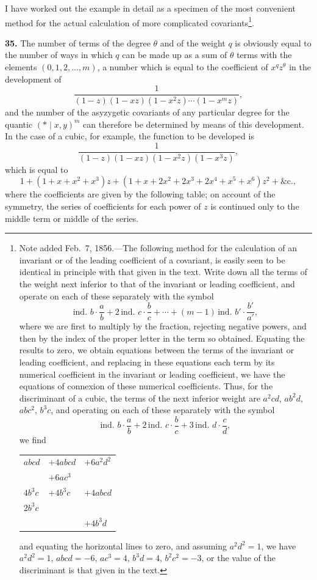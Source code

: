 \documentclass[11pt]{article}
\begin{document}
I have worked out the example in detail as a specimen of the most convenient method for the actual calculation of more complicated covariants\footnote{Note added Feb.~7, 1856.---The following method for the calculation of an invariant or of the leading coefficient of a covariant, is easily seen to be identical in principle with that given in the text. Write down all the terms of the weight next inferior to that of the invariant or leading coefficient, and operate on each of these separately with the symbol
\[
\text{ind. } b\cdot\frac{a}{b} + 2\,\text{ind. } c\cdot\frac{b}{c} + \cdots + (m-1)\,\text{ind. } b'\cdot\frac{b'}{a'},
\]
where we are first to multiply by the fraction, rejecting negative powers, and then by the index of the proper letter in the term so obtained. Equating the results to zero, we obtain equations between the terms of the invariant or leading coefficient, and replacing in these equations each term by its numerical coefficient in the invariant or leading coefficient, we have the equations of connexion of these numerical coefficients. Thus, for the discriminant of a cubic, the terms of the next inferior weight are $a^2 cd$, $ab^2 d$, $abc^2$, $b^3 c$, and operating on each of these separately with the symbol
\[
\text{ind. } b\cdot\frac{a}{b} + 2\,\text{ind. } c\cdot\frac{b}{c} + 3\,\text{ind. } d\cdot\frac{c}{d},
\]
we find
\begin{center}
\begin{tabular}{lll}
$abcd$        & $+ 4 abcd$ & $+ 6 a^2 d^2$ \\
              & $+ 6 ac^3$ &              \\
$4 b^3 c$    & $+ 4 b^3 c$ & $+ 4 abcd$ \\
$2 b^3 c$    &            &              \\
              &            & $+ 4 b^3 d$ \\
\end{tabular}
\end{center}
and equating the horizontal lines to zero, and assuming $a^2 d^2 = 1$, we have $a^2 d^2 = 1$, $abcd = -6$, $ac^3 = 4$, $b^3 d = 4$, $b^2 c^2 = -3$, or the value of the discriminant is that given in the text.}.

\textbf{35.} The number of terms of the degree $\theta$ and of the weight $q$ is obviously equal to the number of ways in which $q$ can be made up as a sum of $\theta$ terms with the elements $(0, 1, 2, \ldots, m)$, a number which is equal to the coefficient of $x^q z^\theta$ in the development of
\[
\frac{1}{(1 - z)(1 - xz)(1 - x^2 z)\cdots(1 - x^m z)},
\]
and the number of the asyzygetic covariants of any particular degree for the quantic $(*\mid x, y)^m$ can therefore be determined by means of this development. In the case of a cubic, for example, the function to be developed is
\[
\frac{1}{(1 - z)(1 - xz)(1 - x^2 z)(1 - x^3 z)},
\]
which is equal to
\[
1 + (1 + x + x^2 + x^3)z + (1 + x + 2x^2 + 2x^3 + 2x^4 + x^5 + x^6)z^2 + \&\text{c.},
\]
where the coefficients are given by the following table; on account of the symmetry, the series of coefficients for each power of $z$ is continued only to the middle term or middle of the series.
\end{document}
